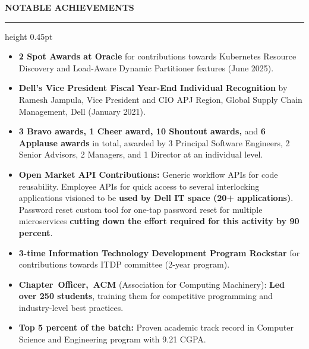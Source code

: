 \documentclass[10pt,a4paper]{article}
\newcommand{\resumesection}[1]{%
  \vspace{5.8pt}%
  {\fontsize{11.65pt}{13pt}\selectfont\bfseries\MakeUppercase{#1}}\par
  \vspace{2.8pt}%
  {\color{black!70}\hrule height 0.45pt}%
  \vspace{6.2pt}%
}
\begin{document}
\resumesection{Notable Achievements}

\begin{itemize}[leftmargin=14.5pt,label=\textbullet,itemsep=1.6pt,topsep=0pt,parsep=0pt,partopsep=0pt]
  \raggedright
  \item \textbf{2 Spot Awards at Oracle} for contributions towards Kubernetes Resource Discovery and Load-Aware Dynamic Partitioner features (June 2025).
  \item \textbf{Dell's Vice President Fiscal Year-End Individual Recognition} by Ramesh Jampula, Vice President and CIO APJ Region, Global Supply Chain Management, Dell (January 2021).
  \item \textbf{3 Bravo awards, 1 Cheer award, 10 Shoutout awards,} and \textbf{6 Applause awards} in total, awarded by 3 Principal Software Engineers, 2 Senior Advisors, 2 Managers, and 1 Director at an individual level.
  \item \textbf{Open Market API Contributions:} Generic workflow APIs for code reusability. Employee APIs for quick access to several interlocking applications visioned to be \textbf{used by Dell IT space (20+ applications)}. Password reset custom tool for one-tap password reset for multiple microservices \textbf{cutting down the effort required for this activity by 90 percent}.
  \item \textbf{3-time Information Technology Development Program Rockstar} for contributions towards ITDP committee (2-year program).
  \item \textbf{Chapter~Officer,~ACM} (Association for Computing Machinery): \textbf{Led over 250 students}, training them for competitive programming and industry-level best practices.
  \item \textbf{Top 5 percent of the batch:} Proven academic track record in Computer Science and Engineering program with 9.21 CGPA.
\end{itemize}
\end{document}
